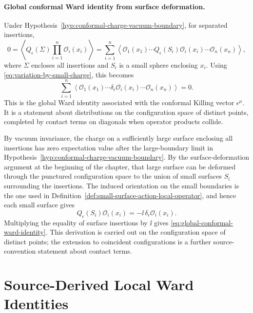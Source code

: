 \paragraph{Global conformal Ward identity from surface deformation.}
Under Hypothesis~\ref{hyp:conformal-charge-vacuum-boundary}, for separated
insertions,
\begin{equation}
  0
  =
  \left\langle
    Q_\epsilon(\Sigma)
    \prod_{i=1}^n\mathcal O_i(x_i)
  \right\rangle
  =
  \sum_{i=1}^n
  \left\langle
    \mathcal O_1(x_1)\cdots
    Q_\epsilon(S_i)\mathcal O_i(x_i)\cdots
    \mathcal O_n(x_n)
  \right\rangle ,
  \label{eq:surface-ward-decomposition}
\end{equation}
where \(\Sigma\) encloses all insertions and \(S_i\) is a small sphere
enclosing \(x_i\).  Using
\eqref{eq:variation-by-small-charge}, this becomes
\begin{equation}
  \sum_{i=1}^n
  \left\langle
    \mathcal O_1(x_1)\cdots
    \delta_\epsilon\mathcal O_i(x_i)\cdots
    \mathcal O_n(x_n)
  \right\rangle
  =
  0.
  \label{eq:global-conformal-ward-identity}
\end{equation}
This is the global Ward identity associated with the conformal Killing vector
\(\epsilon^\mu\).  It is a statement about distributions on the configuration
space of distinct points, completed by contact terms on diagonals when
operator products collide.

By vacuum invariance, the charge on a sufficiently large surface enclosing all
insertions has zero expectation value after the large-boundary limit in
Hypothesis~\ref{hyp:conformal-charge-vacuum-boundary}.  By
the surface-deformation argument at the beginning of the chapter, that large
surface can be deformed through the punctured configuration space to the union
of small surfaces \(S_i\) surrounding the insertions.  The induced orientation
on the small boundaries is the one used in
Definition~\ref{def:small-surface-action-local-operator}, and hence each
small surface gives
\[
  Q_\epsilon(S_i)\mathcal O_i(x_i)
  =
  -\ii\,\delta_\epsilon\mathcal O_i(x_i).
\]
Multiplying the equality of surface insertions by \(\ii\) gives
\eqref{eq:global-conformal-ward-identity}.  This derivation is carried out on the
configuration space of distinct points; the extension to coincident
configurations is a further source-convention statement about contact terms.

\section{Source-Derived Local Ward Identities}

